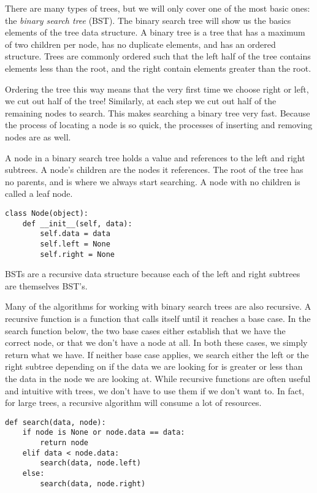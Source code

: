 There are many types of trees, but we will only cover one of the most basic ones: the \emph{binary search tree} (BST).
The binary search tree will show us the basics elements of the tree data structure.
A binary tree is a tree that has a maximum of two children per node,
has no duplicate elements, and has an ordered structure.
Trees are commonly ordered such that the left half of the tree contains elements less than the root, and the right contain elements greater than the root.

Ordering the tree this way means that the very first time we choose right or left, we cut out half of the tree!
Similarly, at each step we cut out half of the remaining nodes to search.
This makes searching a binary tree very fast.
Because the process of locating a node is so quick, the processes of inserting and removing nodes are as well.

A node in a binary search tree holds a value and references to the left and right subtrees.
A node's children are the nodes it references.
The root of the tree has no parents, and is where we always start searching.
A node with no children is called a leaf node.

\begin{lstlisting}
class Node(object):
    def __init__(self, data):
        self.data = data
        self.left = None
        self.right = None
\end{lstlisting}

BSTs are a recursive data structure because each of the left and right subtrees are themselves BST's.

Many of the algorithms for working with binary search trees are also recursive.
A recursive function is a function that calls itself until it reaches a base case.
In the search function below, the two base cases either establish that we have the correct
node, or that we don't have a node at all.
In both these cases, we simply return what we have.
If neither base case applies, we search either the left or the right subtree depending on if the data we are looking for is greater or less than the data in the node we are looking at.
While recursive functions are often useful and intuitive with trees, we don't have to use them if we don't want to.
In fact, for large trees, a recursive algorithm will consume a lot of resources.

\begin{lstlisting}
def search(data, node):
    if node is None or node.data == data:
        return node
    elif data < node.data:
        search(data, node.left)
    else:
        search(data, node.right)
\end{lstlisting}


